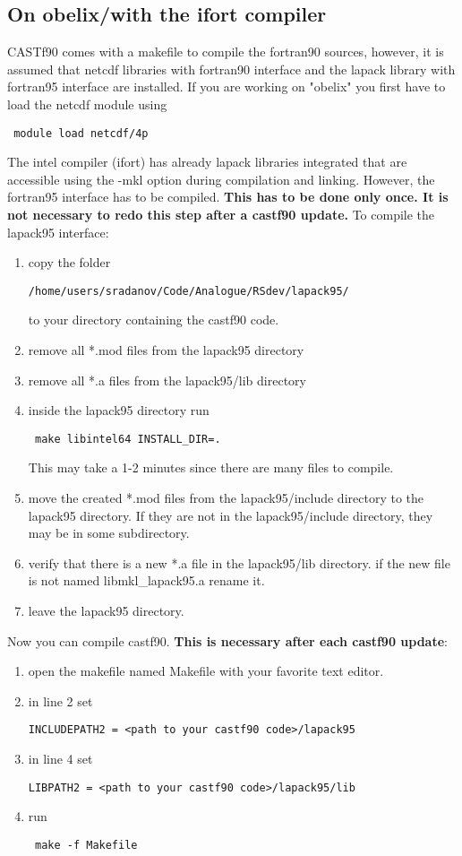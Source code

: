 \documentclass[11p,a4paper]{article}
\begin{document}
\subsection{On obelix/with the ifort compiler}
CASTf90 comes with a makefile to compile the fortran90 sources, however, it is assumed that netcdf libraries with fortran90 interface and the lapack library with fortran95 interface are installed.
If you are working on "obelix" you first have to load the netcdf module using
\begin{verbatim}
 module load netcdf/4p
\end{verbatim}
The intel compiler (ifort) has already lapack libraries integrated that are accessible using the -mkl option during compilation and linking. However, the fortran95 interface has to be compiled. \textbf{This has to be done only once. It is not necessary to redo this step after a castf90 update.} To compile the lapack95 interface:
\begin{enumerate}
\item copy the folder
\begin{verbatim}
/home/users/sradanov/Code/Analogue/RSdev/lapack95/
\end{verbatim}
to your directory containing the castf90 code.
\item remove all *.mod files from the lapack95 directory
\item remove all *.a files from the lapack95/lib directory
\item inside the lapack95 directory run
\begin{verbatim}
 make libintel64 INSTALL_DIR=.
\end{verbatim}
This may take a 1-2 minutes since there are many files to compile.
\item move the created *.mod files from the lapack95/include directory to the lapack95 directory. If they are not in the lapack95/include directory, they may be in some subdirectory.
\item verify that there is a new *.a file in the lapack95/lib directory. if the new file is not named  libmkl\_lapack95.a rename it.
\item leave the lapack95 directory.
\end{enumerate}
Now you can compile castf90. \textbf{This is necessary after each castf90 update}:
\begin{enumerate}
\item open the makefile named Makefile with your favorite text editor.
\item in line 2 set 
\begin{verbatim}
INCLUDEPATH2 = <path to your castf90 code>/lapack95
\end{verbatim}
\item in line 4 set
\begin{verbatim}
LIBPATH2 = <path to your castf90 code>/lapack95/lib
\end{verbatim}
\item run
\begin{verbatim}
 make -f Makefile
\end{verbatim}
\end{enumerate}
\end{document}

